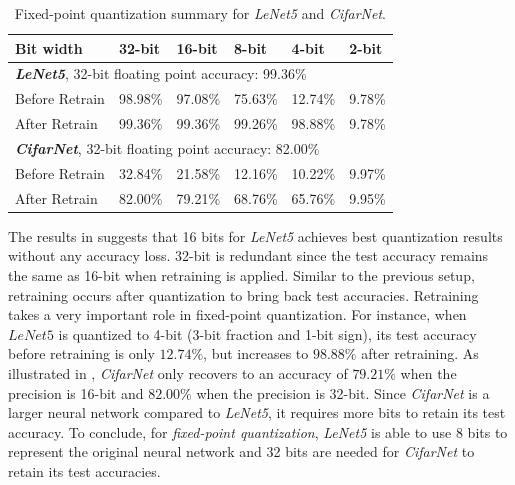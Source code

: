 \documentclass[a4paper,12pt]{report}
\begin{document}
\begin{table}[!h]
  \centering
  \begin{tabular}{llllll}
    \hline
    \hline
    Bit width               &32-bit     &16-bit     &8-bit    &4-bit    &2-bit  \\
    \hline
    \multicolumn{5}{l}{\textbf{\textit{LeNet5}}, 32-bit floating point accuracy: 99.36\%}\\
    \hline
    \hline
    Before Retrain          &98.98\%    &97.08\%    &75.63\%    &12.74\%  &9.78\%\\
    After Retrain           &99.36\%    &99.36\%    &99.26\%    &98.88\%  &9.78\%\\
    \hline
    \hline
    \multicolumn{5}{l}{\textbf{\textit{CifarNet}}, 32-bit floating point accuracy: 82.00\%}\\
    \hline
    Before Retrain          &32.84\%        &21.58\%    &12.16\%  &10.22\%  &9.97\%\\
    After Retrain           &82.00\%        &79.21\%    &68.76\%  &65.76\%  &9.95\%\\
    \hline
    \hline
  \end{tabular}
  \caption{Fixed-point quantization summary for \textit{LeNet5} and \textit{CifarNet}.}
  \label{tab:fp_sum}
\end{table}

The results in  suggests that 16 bits for \textit{LeNet5}
achieves best quantization results without any accuracy loss.
32-bit is redundant since the test accuracy remains the same as 16-bit when
retraining is applied.
Similar to the previous setup, retraining occurs after quantization to bring
back test accuracies.
Retraining takes a very important role in fixed-point quantization.
For instance, when $LeNet5$ is quantized to 4-bit (3-bit fraction and 1-bit sign),
its test accuracy before retraining is only $12.74\%$, but increases to $98.88\%$ after retraining.
As illustrated in , \textit{CifarNet} only recovers to an accuracy
of $79.21\%$ when the precision is 16-bit and $82.00\%$ when the precision is
32-bit.
Since \textit{CifarNet} is a larger neural network compared to \textit{LeNet5},
it requires more bits to retain its test accuracy.
To conclude, for \textit{fixed-point quantization}, \textit{LeNet5} is able to
use $8$ bits to represent the original neural network and 32 bits are needed for
\textit{CifarNet} to retain its test accuracies.

\end{document}
